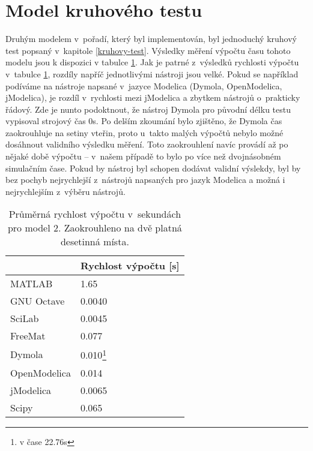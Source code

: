 \section{Model kruhového testu}
\label{srovnani-kruh}
Druhým modelem v~pořadí, který byl implementován, byl jednoduchý kruhový test popsaný v~kapitole \ref{kruhovy-test}. Výsledky měření výpočtu času tohoto modelu jsou k dispozici v tabulce \ref{tab:kruh-tabulka}. Jak je patrné z~výsledků rychlosti výpočtu v~tabulce \ref{tab:kruh-tabulka}, rozdíly napříč jednotlivými nástroji jsou velké. Pokud se například podíváme na nástroje napsané v~jazyce Modelica (Dymola, OpenModelica, jModelica), je rozdíl v~rychlosti mezi jModelica a zbytkem nástrojů o~prakticky řádový. Zde je nunto podoktnout, že nástroj Dymola pro původní délku testu vypisoval strojový čas 0s. Po delším zkoumání bylo zjištěno, že Dymola čas zaokrouhluje na setiny vteřin, proto u~takto malých výpočtů nebylo možné dosáhnout validního  výsledku měření. Toto zaokrouhlení navíc provádí až po nějaké době výpočtu -- v~našem případě to bylo po více než dvojnásobném simulačním čase. Pokud by nástroj byl schopen dodávat validní výslekdy, byl by bez pochyb nejrychlejší z~nástrojů napsaných pro jazyk Modelica a možná i nejrychlejším z~výběru nástrojů.

\begin{savenotes}
\begin{table}[]
\centering
\begin{tabular}{|l|l|}
\hline
             & Rychlost výpočtu {[}s{]} \\ \hline
MATLAB       &         1.65\\ \hline
GNU Octave   &           0.0040\\ \hline
SciLab       &            0.0045\\ \hline
FreeMat &                  0.077\\ \hline
Dymola       &           0.010\footnote{v čase 22.76s}\\ \hline
OpenModelica    &        0.014\\ \hline
jModelica        &       0.0065\\ \hline
Scipy             &      0.065\\ \hline
\end{tabular}
\caption{Průměrná rychlost výpočtu v~sekundách pro model 2. Zaokrouhleno na dvě platná desetinná místa.}
\label{tab:kruh-tabulka}
\end{table}
\end{savenotes}

